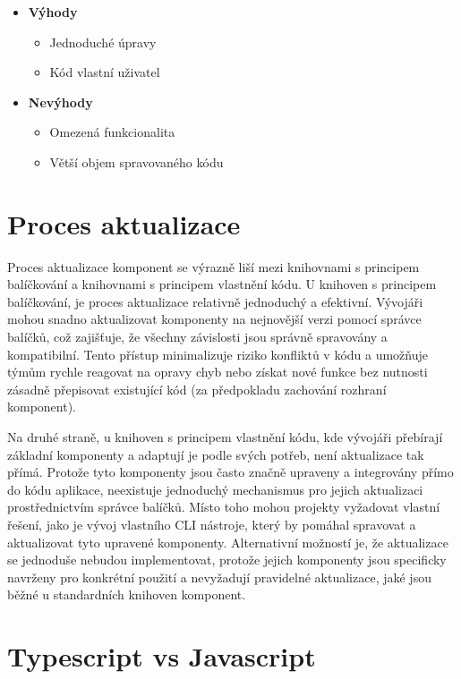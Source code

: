\begin{itemize}
    \item \textbf{Výhody}
    \begin{itemize}
        \item Jednoduché úpravy
        \item Kód vlastní uživatel
    \end{itemize}
    \item \textbf{Nevýhody}
    \begin{itemize}
        \item Omezená funkcionalita
        \item Větší objem spravovaného kódu
    \end{itemize}
\end{itemize}

\section{Proces aktualizace}
Proces aktualizace komponent se výrazně liší mezi knihovnami s principem balíčkování a knihovnami s principem vlastnění kódu. U knihoven s principem balíčkování, je proces aktualizace relativně jednoduchý a efektivní. Vývojáři mohou snadno aktualizovat komponenty na nejnovější verzi pomocí správce balíčků, což zajišťuje, že všechny závislosti jsou správně spravovány a kompatibilní. Tento přístup minimalizuje riziko konfliktů v kódu a umožňuje týmům rychle reagovat na opravy chyb nebo získat nové funkce bez nutnosti zásadně přepisovat existující kód (za předpokladu zachování rozhraní komponent).

Na druhé straně, u knihoven s principem vlastnění kódu, kde vývojáři přebírají základní komponenty a adaptují je podle svých potřeb, není aktualizace tak přímá. Protože tyto komponenty jsou často značně upraveny a integrovány přímo do kódu aplikace, neexistuje jednoduchý mechanismus pro jejich aktualizaci prostřednictvím správce balíčků. Místo toho mohou projekty vyžadovat vlastní řešení, jako je vývoj vlastního CLI nástroje, který by pomáhal spravovat a aktualizovat tyto upravené komponenty. Alternativní možností je, že aktualizace se jednoduše nebudou implementovat, protože jejich komponenty jsou specificky navrženy pro konkrétní použití a nevyžadují pravidelné aktualizace, jaké jsou běžné u standardních knihoven komponent.

\section{Typescript vs Javascript}

